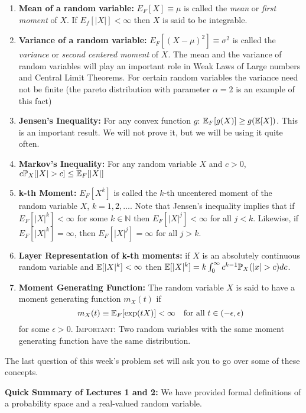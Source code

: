 \documentclass[11pt]{article} %
\begin{document}
 \begin{enumerate}
 \item \textbf{Mean of a random variable:} $E_{F}[X] \equiv \mu$ is called the \emph{mean} or \emph{first moment} of $X$. If $E_{f}[|X|]< \infty$ then $X$ is said to be integrable.
 \item \textbf{Variance of a random variable:} $E_{F}[ (X-\mu)^2 ]\equiv \sigma^2$ is called the \emph{variance} or \emph{second centered moment} of $X$. The mean and the variance of random variables will play an important role in Weak Laws of Large numbers and Central Limit Theorems. For certain random variables the variance need not be finite (the pareto distribution with parameter $\alpha=2$ is an example of this fact)
 \item \textbf{Jensen's Inequality:} For any convex function $g$: $\mathbb{E}_{F}[g(X)] \geq g(\mathbb{E}[X])$. This is an important result. We will not prove it, but we will be using it quite often.  
 \item \textbf{Markov's Inequality:} For any random variable $X$ and $c>0$, $c\prob_{X}[|X|>c] \leq \expec_{F}[|X|]$  
 \item \textbf{k-th Moment:} $E_{F}[X^{k}]$ is called the $k$-th uncentered moment of the random variable $X$, $k=1,2, \ldots$. Note that Jensen's inequality implies that if $E_{F}[|X|^{k}]<\infty$ for some $k \in \mathbb{N}$ then $E_{F}[|X|^{j}]<\infty$ for all $j<k$. Likewise, if $E_{F}[|X|^{k}]=\infty$, then $E_{F}[|X|^{j}]=\infty$ for all $j>k$. 
 
  \item \textbf{Layer Representation of k-th moments:} if $X$ is an absolutely continuous random variable and $\mathbb{E}[|X|^{k}]<\infty$ then $\expec[|X|^{k}]=k\int_{0}^{\infty}c^{k-1}\prob_{X}(|x|>c)dc$.
 
  \item \textbf{Moment Generating Function:} The random variable $X$ is said to have a moment generating function $m_{X}(t)$ if 
 $$m_{X}(t) \equiv \mathbb{E}_{F}[\exp(tX)]<\infty \quad \text{for all } t \in (-\epsilon, \epsilon)$$
 \noindent for some $\epsilon>0$. {\scshape Important}: Two random variables with the same moment generating function have the same distribution. 
\end{enumerate}

\noindent The last question of this week's problem set will ask you to go over some of these concepts. 

\newpage

\noindent \textbf{Quick Summary of Lectures 1 and 2:} We have provided formal definitions of a probability space and a real-valued random variable. 
\end{document}
